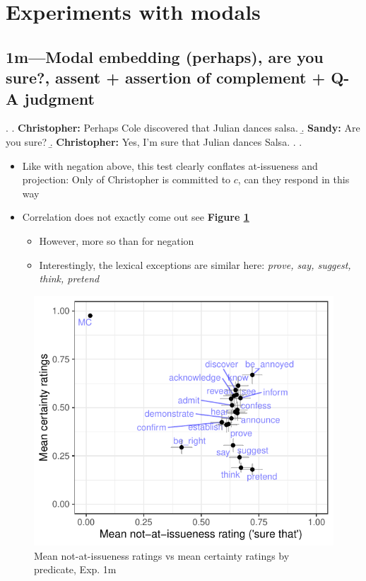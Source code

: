 \documentclass[11pt]{article}
\begin{document}



\section{Experiments with modals}
	\subsection{1m---Modal embedding (perhaps),  are you sure?, assent + assertion of complement + Q-A judgment} %
		\ex. \a. \textbf{Christopher:} Perhaps Cole discovered that Julian dances salsa.
			\b. \textbf{Sandy:} Are you sure?
			\b. \textbf{Christopher:} Yes, I'm sure that Julian dances Salsa.
			\z.
		\z.

		\begin{itemize}
			\item Like with negation above, this test clearly conflates at-issueness and projection: Only of Christopher is committed to $c$, can they respond in this way
			
			\item Correlation does not exactly come out see \textbf{Figure \ref{fig:m1-corr}}
			\begin{itemize}
				\item However, more so than for negation
				\item Interestingly, the lexical exceptions are similar here: \emph{prove, say, suggest, think, pretend}
			\end{itemize}
		\end{itemize}

		\begin{figure}[h]
			\centering
			\includegraphics[scale=0.85]{figures/m1-correl.pdf}
			\caption{Mean not-at-issueness ratings vs mean certainty ratings by predicate, Exp. 1m}
			\label{fig:m1-corr}
		\end{figure}
	
\end{document}
